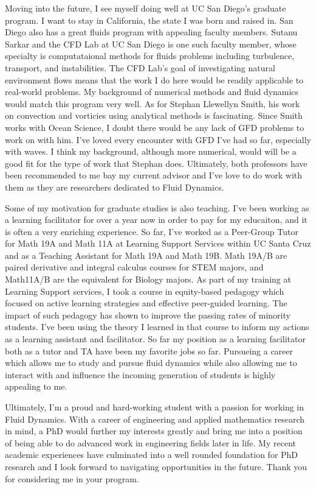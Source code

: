 \documentclass{article}
\begin{document}
Moving into the future, I see myself doing well at UC San Diego's graduate program. I want to stay in California, the state I was born and raised in. San Diego also has a great fluids program with appealing faculty members. Sutanu Sarkar and the CFD Lab at UC San Diego is one such faculty member, whose specialty is computataional methods for fluids problems including turbulence, transport, and instabilities. The CFD Lab's goal of investigating natural environment flows means that the work I do here would be readily applicable to real-world problems. My background of numerical methods and fluid dynamics would match this program very well. As for Stephan Llewellyn Smith, his work on convection and vorticies using analytical methods is fascinating. Since Smith works with Ocean Science, I doubt there would be any lack of GFD problems to work on with him. I've loved every encounter with GFD I've had so far, especially with waves. I think my background, although more numerical, would will be a good fit for the type of work that Stephan does. Ultimately, both professors have been recommended to me bay my current advisor and I've love to do work with them as they are researchers dedicated to Fluid Dynamics. 

Some of my motivation for graduate studies is also teaching. I've been working as a       learning facilitator for over a year now in order to pay for my educaiton, and it is      often a very enriching experience. So far, I've worked as a Peer-Group Tutor for Math 19A and Math 11A at Learning Support Services within UC Santa Cruz and as a Teaching          Assistant for Math 19A and Math 19B. Math 19A/B are paired derivative and integral        calculus courses for STEM majors, and Math11A/B are the equivalent for Biology majors. As part of my training at Learning Support services, I took a course in equity-based         pedagogy which focused on active learning strategies and effective peer-guided learning.  The impact of such pedagogy has shown to improve the passing rates of minority students.  I've been using the theory I learned in that course to inform my actions as a learning    assistant and facilitator. So far my position as a learning facilitator both as a tutor   and TA have been my favorite jobs so far. Pursueing a career which allows me to study and pursue fluid dynamics while also allowing me to interact with and influence the incoming  generation of students is highly appealing to me.

Ultimately, I'm a proud and hard-working student with a passion for working in Fluid Dynamics. With a career of engineering and applied mathematics research in mind, a PhD would further my interests greatly and bring me into a position of being able to do advanced work in engineering fields later in life. My recent academic experiences have culminated into a well rounded foundation for PhD research and I look forward to navigating opportunities in the future. Thank you for considering me in your program. 
\end{document}
